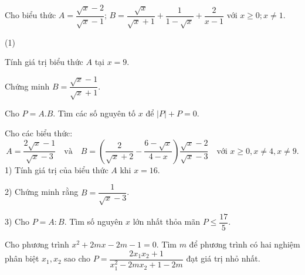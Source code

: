 \documentclass[12pt]{article}
\begin{document}
\begin{bt}
Cho biểu thức $A = \dfrac{\sqrt{x}-2}{\sqrt{x}-1}$; $B = \dfrac{\sqrt{x}}{\sqrt{x}+1} + \dfrac{1}{1-\sqrt{x}} + \dfrac{2}{x-1}$ với $x \ge 0; x \ne 1$.
\begin{cacy}(1)
\item Tính giá trị biểu thức $A$ tại $x = 9$.
\item Chứng minh $B = \dfrac{\sqrt{x}-1}{\sqrt{x}+1}$.
\item Cho $P = A.B$. Tìm các số nguyên tố $x$ để $|P| + P = 0$.
\end{cacy}
\loigiai{}
\end{bt}

\begin{bt}
Cho các biểu thức:
\[
A = \dfrac{2\sqrt{x} - 1}{\sqrt{x} - 3} \quad \text{và} \quad B = \left( \dfrac{2}{\sqrt{x} + 2} - \dfrac{6 - \sqrt{x}}{4 - x} \right) \dfrac{\sqrt{x} - 2}{\sqrt{x} - 3} \quad \text{với } x \ge 0, x \ne 4, x \ne 9.
\]
1) Tính giá trị của biểu thức $A$ khi $x = 16$.

2) Chứng minh rằng $B = \dfrac{1}{\sqrt{x} - 3}$.

3) Cho $P = A : B$. Tìm số nguyên $x$ lớn nhất thỏa mãn $P \le \dfrac{17}{5}$.
\end{bt}


\begin{bt}
Cho phương trình $x^2+2mx-2m-1=0$. Tìm $m$ để phương trình có hai nghiệm phân biệt $x_1, x_2$ sao cho $P=\dfrac{2x_1x_2+1}{x_1^2-2mx_2+1-2m}$ đạt giá trị nhỏ nhất.
\end{bt}
\end{document}
